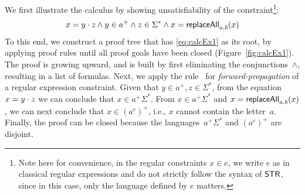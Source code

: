 \begin{example}
  \label{ex:calc1}
  We first illustrate the calculus by showing unsatisfiability of the
  constraint\footnote{Note here for convenience, in the regular constraints $x \in e$, we write $e$ as in classical regular expressions and do not strictly follow the syntax of $\mathsf{STR}$, since in this case, only the language defined by $e$ matters. }:
  \begin{equation}
    \label{eq:calcEx1}
    x = y \cdot z \wedge y \in a^+ \wedge z \in \Sigma^*
    \wedge x = \mathsf{replaceAll}_{a, b}(x)
  \end{equation}
  To this end, we construct a proof tree that has \eqref{eq:calcEx1}
  as its root, by applying proof rules until all proof goals have been
  closed (Figure~\ref{fig:calcEx1}). The proof is growing upward, and
  is built by first eliminating the conjunctions~$\wedge$, resulting
  in a list of formulas. Next, we apply the rule~ for
  \emph{forward-propagation} of a regular expression constraint. Given
  that $y \in a^+, z \in \Sigma^*$, from the
  equation~$x = y \cdot z$ we can conclude that $x \in
  a^+\Sigma^*$. From $x \in a^+\Sigma^*$ and
  $x = \mathsf{replaceAll}_{a, b}(x)$, we can next conclude that
  $x \in (a^c)^+$, i.e., $x$ cannot contain the letter~$a$. Finally,
  the proof can be closed because the languages~$a^+\Sigma^*$ and
  $(a^c)^+$ are disjoint.
\end{example}

